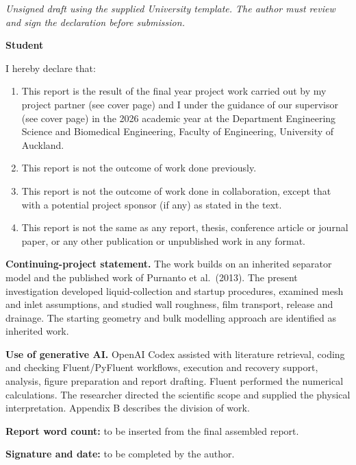 \documentclass[12pt]{article}
\newcommand{\tightlist}{\setlength{\itemsep}{0pt}\setlength{\parskip}{0pt}}
\begin{document}
\clearpage

\emph{Unsigned draft using the supplied University template. The author must review and sign the declaration before submission.}

\textbf{Student}

I hereby declare that:

\begin{enumerate}
\def\labelenumi{\arabic{enumi}.}
\tightlist
\item
  This report is the result of the final year project work carried out by my project partner (see cover page) and I under the guidance of our supervisor (see cover page) in the 2026 academic year at the Department Engineering Science and Biomedical Engineering, Faculty of Engineering, University of Auckland.
\item
  This report is not the outcome of work done previously.
\item
  This report is not the outcome of work done in collaboration, except that with a potential project sponsor (if any) as stated in the text.
\item
  This report is not the same as any report, thesis, conference article or journal paper, or any other publication or unpublished work in any format.
\end{enumerate}

\textbf{Continuing-project statement.} The work builds on an inherited separator model and the published work of Purnanto et al.~(2013). The present investigation developed liquid-collection and startup procedures, examined mesh and inlet assumptions, and studied wall roughness, film transport, release and drainage. The starting geometry and bulk modelling approach are identified as inherited work.

\textbf{Use of generative AI.} OpenAI Codex assisted with literature retrieval, coding and checking Fluent/PyFluent workflows, execution and recovery support, analysis, figure preparation and report drafting. Fluent performed the numerical calculations. The researcher directed the scientific scope and supplied the physical interpretation. Appendix B describes the division of work.

\textbf{Report word count:} to be inserted from the final assembled report.

\textbf{Signature and date:} to be completed by the author.

\clearpage
\tableofcontents\clearpage\listoffigures\clearpage\listoftables\clearpage
\end{document}
